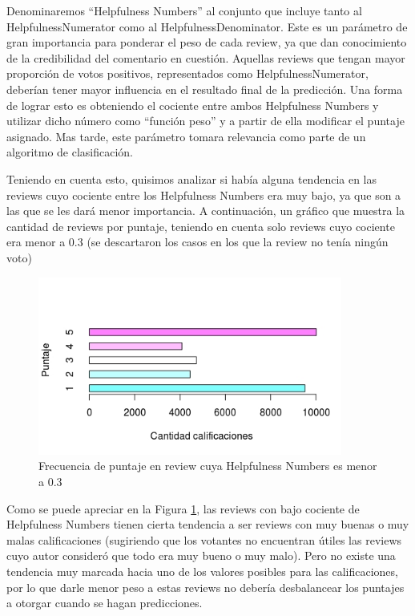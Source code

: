 \documentclass[a4paper,11pt]{report}
\begin{document}
Denominaremos “Helpfulness Numbers” al conjunto que incluye tanto al HelpfulnessNumerator como al HelpfulnessDenominator. Este es un parámetro de gran importancia para ponderar el peso de cada review, ya que dan conocimiento de la credibilidad del comentario en cuestión. Aquellas reviews que tengan mayor proporción de votos positivos, representados como HelpfulnessNumerator, deberían tener mayor influencia en el resultado final de la predicción. Una forma de lograr esto es obteniendo el cociente entre ambos Helpfulness Numbers y utilizar dicho número como “función peso” y a partir de ella modificar el puntaje asignado. Mas tarde, este parámetro tomara relevancia como parte de un algoritmo de clasificación.

Teniendo en cuenta esto, quisimos analizar si había alguna tendencia en las reviews cuyo cociente entre los Helpfulness Numbers era muy bajo, ya que son a las que se les dará menor importancia.
A continuación, un gráfico que muestra la cantidad de reviews por puntaje, teniendo en cuenta solo reviews cuyo cociente era menor a 0.3 (se descartaron los casos en los que la review no tenía ningún voto)

\begin{figure}[htp]
  \begin{center}
    \includegraphics[width=10cm]{puntajcantfilter}
    \caption{Frecuencia de puntaje en review cuya Helpfulness Numbers es menor a 0.3}
    \label{fig:3}
  \end{center}
\end{figure}

Como se puede apreciar en la Figura \ref{fig:3}, las reviews con bajo cociente de Helpfulness Numbers tienen cierta tendencia a ser reviews con muy buenas o muy malas calificaciones (sugiriendo que los votantes no encuentran útiles las reviews cuyo autor consideró que todo era muy bueno o muy malo). Pero no existe una tendencia muy marcada hacia uno de los valores posibles para las calificaciones, por lo que darle menor peso a estas reviews no debería desbalancear los puntajes a otorgar cuando se hagan predicciones.
\end{document}
